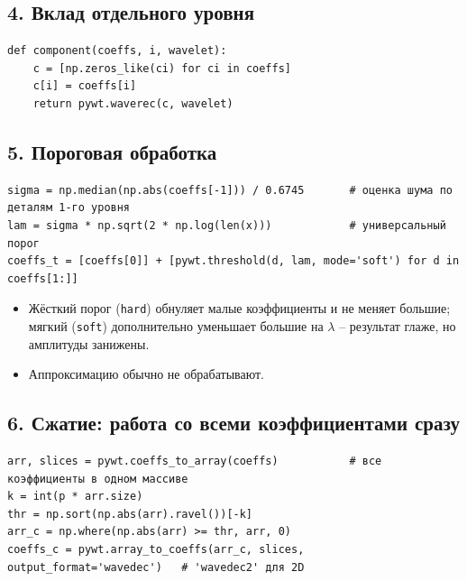 \documentclass[12pt,a4paper,openany]{book}
\providecommand{\tightlist}{\setlength{\itemsep}{0pt}\setlength{\parskip}{0pt}}
\begin{document}
\subsection*{4. Вклад отдельного уровня}

\begin{Verbatim}[fontsize=\small, breaklines, breakanywhere]
def component(coeffs, i, wavelet):
    c = [np.zeros_like(ci) for ci in coeffs]
    c[i] = coeffs[i]
    return pywt.waverec(c, wavelet)
\end{Verbatim}

\subsection*{5. Пороговая обработка}

\begin{Verbatim}[fontsize=\small, breaklines, breakanywhere]
sigma = np.median(np.abs(coeffs[-1])) / 0.6745       # оценка шума по деталям 1-го уровня
lam = sigma * np.sqrt(2 * np.log(len(x)))            # универсальный порог
coeffs_t = [coeffs[0]] + [pywt.threshold(d, lam, mode='soft') for d in coeffs[1:]]
\end{Verbatim}

\begin{itemize}
\tightlist
\item
  Жёсткий порог (\texttt{\textquotesingle{}\allowbreak{}hard\textquotesingle{}\allowbreak{}}) обнуляет малые коэффициенты и не меняет большие; мягкий (\texttt{\textquotesingle{}\allowbreak{}soft\textquotesingle{}\allowbreak{}}) дополнительно уменьшает большие на \(\lambda\) -- результат глаже, но амплитуды занижены.
\item
  Аппроксимацию обычно не обрабатывают.
\end{itemize}

\subsection*{6. Сжатие: работа со всеми коэффициентами сразу}

\begin{Verbatim}[fontsize=\small, breaklines, breakanywhere]
arr, slices = pywt.coeffs_to_array(coeffs)           # все коэффициенты в одном массиве
k = int(p * arr.size)
thr = np.sort(np.abs(arr).ravel())[-k]
arr_c = np.where(np.abs(arr) >= thr, arr, 0)
coeffs_c = pywt.array_to_coeffs(arr_c, slices, output_format='wavedec')   # 'wavedec2' для 2D
\end{Verbatim}
\end{document}
